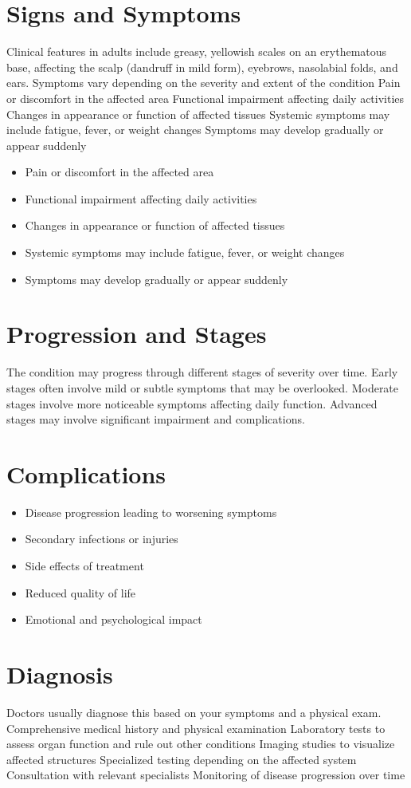 \section{Signs and Symptoms}
Clinical features in adults include greasy, yellowish scales on an erythematous base, affecting the scalp (dandruff in mild form), eyebrows, nasolabial folds, and ears. Symptoms vary depending on the severity and extent of the condition Pain or discomfort in the affected area Functional impairment affecting daily activities Changes in appearance or function of affected tissues Systemic symptoms may include fatigue, fever, or weight changes Symptoms may develop gradually or appear suddenly

\begin{itemize}[noitemsep]
  \item Pain or discomfort in the affected area
  \item Functional impairment affecting daily activities
  \item Changes in appearance or function of affected tissues
  \item Systemic symptoms may include fatigue, fever, or weight changes
  \item Symptoms may develop gradually or appear suddenly
\end{itemize}
\section{Progression and Stages}
The condition may progress through different stages of severity over time. Early stages often involve mild or subtle symptoms that may be overlooked. Moderate stages involve more noticeable symptoms affecting daily function. Advanced stages may involve significant impairment and complications.
\section{Complications}
\begin{itemize}[noitemsep]
  \item Disease progression leading to worsening symptoms
  \item Secondary infections or injuries
  \item Side effects of treatment
  \item Reduced quality of life
  \item Emotional and psychological impact
\end{itemize}
\section{Diagnosis}
Doctors usually diagnose this based on your symptoms and a physical exam. Comprehensive medical history and physical examination Laboratory tests to assess organ function and rule out other conditions Imaging studies to visualize affected structures Specialized testing depending on the affected system Consultation with relevant specialists Monitoring of disease progression over time

